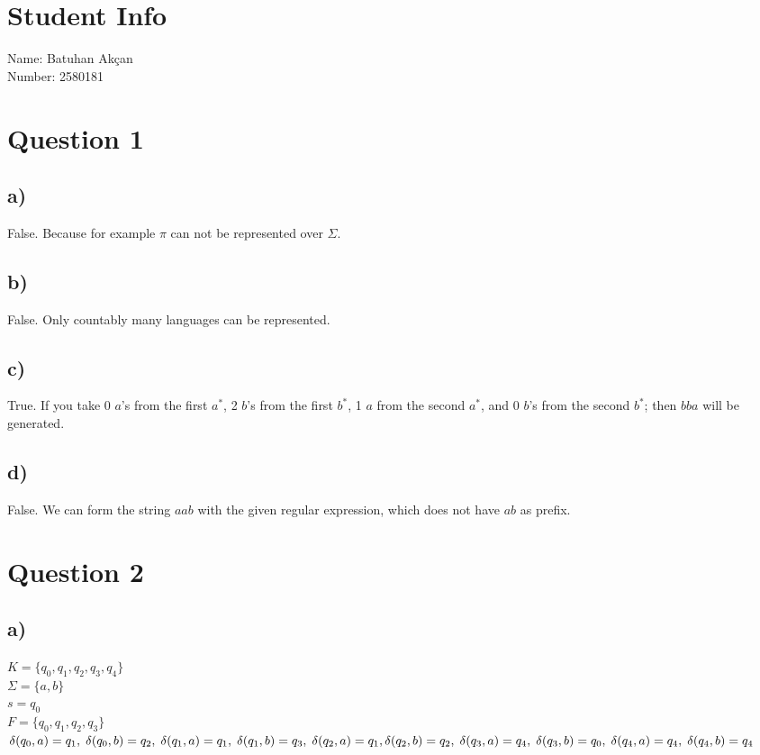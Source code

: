 \documentclass{article}
\begin{document}
\section*{Student Info}
Name: Batuhan Akçan\\
Number: 2580181
\section*{Question 1}
\subsection*{a)} False. Because for example $\pi$ can not be represented over $\Sigma$.
\subsection*{b)} False. Only countably many languages can be represented.
\subsection*{c)} True. If you take 0 $a$'s from the first $a^*$, 2 $b$'s from the first $b^*$, 1 $a$ from the second $a^*$, and 0 $b$'s from the second $b^*$; then $bba$ will be generated.
\subsection*{d)} False. We can form the string $aab$ with the given regular expression, which does not have $ab$ as prefix.
\section*{Question 2}
\subsection*{a)}
$K =\{q_0, q_1, q_2, q_3, q_4\}$\vspace{0.2cm}\\
$\Sigma = \{a, b\}$\vspace{0.2cm}\\
$s = q_0$\vspace{0.2cm}\\
$F = \{q_0,q_1,q_2,q_3\}$\vspace{0.2cm}\\
$\delta(q_0,a) = q_1, \; \delta(q_0,b) = q_2, \; \delta(q_1,a) = q_1, \; \delta(q_1,b)=q_3, \; \delta(q_2,a)=q_1, \\ \delta(q_2,b)=q_2, \; \delta(q_3,a)=q_4, \; \delta(q_3,b)=q_0, \; \delta(q_4,a)=q_4, \; \delta(q_4,b)=q_4$
\end{document}

